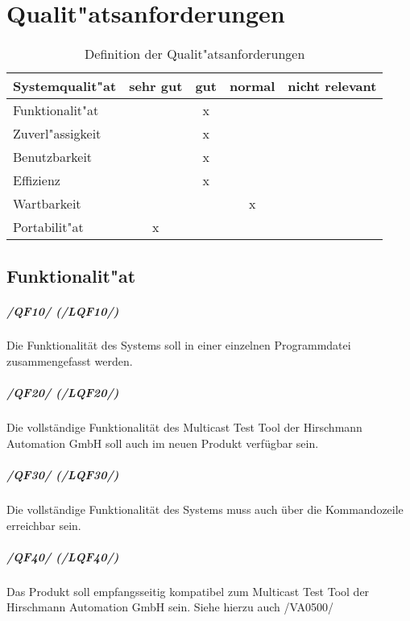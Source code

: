 \chapter{Qualit"atsanforderungen}
\label{cha:qual}


\begin{table}[htdp]
\caption{Definition der Qualit"atsanforderungen}
\label{tab:quality}
\begin{center}
\begin{tabular}{|l|c|c|c|c|}
\hline
\textbf{Systemqualit"at} & \textbf{sehr gut} & \textbf{gut} & \textbf{normal} & \textbf{nicht relevant} \\
\hline
Funktionalit"at & & x & & \\
\hline
Zuverl"assigkeit & & x & & \\
\hline
Benutzbarkeit & & x & & \\
\hline
Effizienz & & x & & \\
\hline
Wartbarkeit & & & x & \\
\hline
Portabilit"at & x & & &  \\
\hline
\end{tabular}
\end{center}
\label{default}
\end{table}

\section{Funktionalit"at}

\paragraph{/QF10/ (/LQF10/)} Die Funktionalität des Systems soll in einer
einzelnen Programmdatei zusammengefasst werden.

\paragraph{/QF20/ (/LQF20/)} Die vollständige Funktionalität des
Multicast Test Tool der Hirschmann Automation GmbH soll auch im neuen
Produkt verfügbar sein.

\paragraph{/QF30/ (/LQF30/)} Die vollständige Funktionalität des Systems muss
auch über die Kommandozeile erreichbar sein.

\paragraph{/QF40/ (/LQF40/)} Das Produkt soll empfangsseitig kompatibel zum
Multicast Test Tool der Hirschmann Automation GmbH sein. Siehe hierzu auch /VA0500/
 
